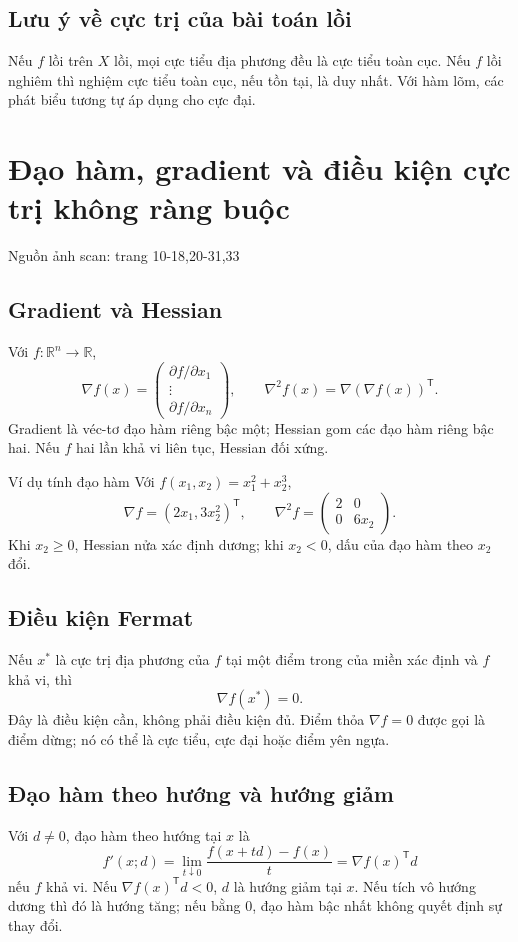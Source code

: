 \documentclass[11pt,a4paper]{article}
\newcommand{\R}{\mathbb{R}}
\newcommand{\grad}{\nabla}
\newcommand{\Hess}{\nabla^2}
\newcommand{\T}{^{\mathsf T}}
\newcommand{\src}[1]{\hfill{\footnotesize\color{gray}Nguồn ảnh scan: trang #1}}
\begin{document}
\subsection{Lưu ý về cực trị của bài toán lồi}
Nếu \(f\) lồi trên \(X\) lồi, mọi cực tiểu địa phương đều là cực tiểu toàn cục. Nếu \(f\) lồi nghiêm thì nghiệm cực tiểu toàn cục, nếu tồn tại, là duy nhất. Với hàm lõm, các phát biểu tương tự áp dụng cho cực đại.

\section{Đạo hàm, gradient và điều kiện cực trị không ràng buộc}
\src{10-18,20-31,33}

\subsection{Gradient và Hessian}
Với \(f:\R^n\to\R\),
\[
\grad f(x)=
\begin{pmatrix}
\partial f/\partial x_1\\ \vdots\\ \partial f/\partial x_n
\end{pmatrix},
\qquad
\Hess f(x)=\grad(\grad f(x))\T.
\]
Gradient là véc-tơ đạo hàm riêng bậc một; Hessian gom các đạo hàm riêng bậc hai. Nếu \(f\) hai lần khả vi liên tục, Hessian đối xứng.

\begin{exbox}{Ví dụ tính đạo hàm}
Với \(f(x_1,x_2)=x_1^2+x_2^3\),
\[
\grad f=(2x_1,3x_2^2)\T,\qquad
\Hess f=\begin{pmatrix}2&0\\0&6x_2\end{pmatrix}.
\]
Khi \(x_2\ge0\), Hessian nửa xác định dương; khi \(x_2<0\), dấu của đạo hàm theo \(x_2\) đổi.
\end{exbox}

\subsection{Điều kiện Fermat}
Nếu \(x^*\) là cực trị địa phương của \(f\) tại một điểm trong của miền xác định và \(f\) khả vi, thì
\[
\grad f(x^*)=0.
\]
Đây là điều kiện cần, không phải điều kiện đủ. Điểm thỏa \(\grad f=0\) được gọi là điểm dừng; nó có thể là cực tiểu, cực đại hoặc điểm yên ngựa.

\subsection{Đạo hàm theo hướng và hướng giảm}
Với \(d\ne0\), đạo hàm theo hướng tại \(x\) là
\[
f'(x;d)=\lim_{t\downarrow0}\frac{f(x+td)-f(x)}t
=\grad f(x)\T d
\]
nếu \(f\) khả vi. Nếu \(\grad f(x)\T d<0\), \(d\) là hướng giảm tại \(x\). Nếu tích vô hướng dương thì đó là hướng tăng; nếu bằng \(0\), đạo hàm bậc nhất không quyết định sự thay đổi.
\end{document}
